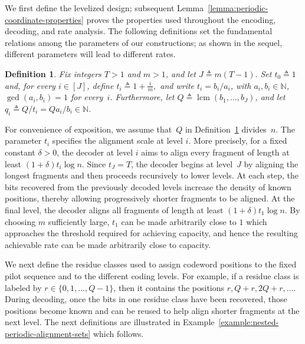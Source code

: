 \documentclass[journal,letterpaper,onecolumn,11pt]{IEEEtran}
\newcommand{\bN}{\mathbb{N}}
\newtheorem{definition}{Definition}
\begin{document}
We first define the levelized design;
subsequent Lemma~\ref{lemma:periodic-coordinate-properties} proves the properties used throughout the encoding, decoding, and rate analysis.
The following definitions set the fundamental relations among the parameters of our constructions; as shown in the sequel, different parameters will lead to different rates. 
\begin{definition}
\label{definition:alignment-scales}
Fix integers $T>1$ and $m>1$, and let
$
J\triangleq m(T-1).
$
Set $t_0\triangleq 1$ and, for every $i\in[J]$, define
$
t_i\triangleq 1+\frac{i}{m},
$
and write \(t_i=b_i/a_i\), with
\(a_i,b_i\in\mathbb N\), \(\gcd(a_i,b_i)=1\) for every~\(i\). 
Furthermore, let
\(Q\triangleq\operatorname{lcm}(b_1,\ldots,b_J)\), and let
\(q_i\triangleq Q/t_i=Qa_i/b_i\in\bN\).
\end{definition}
For convenience of exposition, we assume that~$Q$ in Definition~\ref{definition:alignment-scales} divides~$n$.
The parameter \(t_i\) specifies the alignment scale at level \(i\). More
precisely, for a fixed constant \(\delta>0\), the decoder at level \(i\)
aims to align every fragment of length at least
\((1+\delta)t_i\log n\). Since \(t_J=T\), the decoder begins at level~\(J\)
by aligning the longest fragments and then proceeds recursively to lower
levels. At each step, the bits recovered from the previously decoded levels
increase the density of known positions, thereby allowing progressively
shorter fragments to be aligned.
At the final level, the decoder aligns all fragments of length at least
\((1+\delta)t_1\log n\). By choosing \(m\) sufficiently large, $t_1$ can be made arbitrarily close to $1$ which approaches the threshold required for achieving
capacity, and hence the resulting achievable rate can be made arbitrarily
close to capacity.

We next define the residue classes used to assign codeword positions to
the fixed pilot sequence and to the different coding levels.
For example, if a residue
class is labeled by \(r\in\{0,1,\ldots,Q-1\}\), then it contains the
positions \(r,Q+r,2Q+r,\ldots\). 
During decoding, once the bits in one residue class have
been recovered, those positions become known and can be reused to help
align shorter fragments at the next level. 
The next definitions are illustrated in Example~\ref{example:nested-periodic-alignment-sets} which follows.
\end{document}

